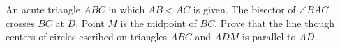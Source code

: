 An acute triangle $ABC$ in which $AB<AC$ is given. The bisector of $\angle BAC$ crosses $BC$ at $D$. Point $M$ is the midpoint of $BC$. Prove that the line though centers of circles escribed on triangles $ABC$ and $ADM$ is parallel to $AD$.
